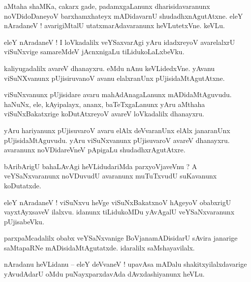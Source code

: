 \documentclass{article}
\begin{document}
\begin{mn}%
aMtaha shaMKa, cakarx gade, padamxgaLanunx dharisidavaranunx noVDidoDaneyoV barxhamxhateyx 
mADidavarnU shudadhxnAgutAtxne. eleY nAradaneV ! avarigiMtalU utatxmarAdavaranunx heVLutetxVne. 
keVLu.
\end{mn}

\begin{mn}%
eleY nAradaneV ! I loVkadalilx veYSaxvarAgi yAru idadxreyoV avarelalxrU viSuNxvige samareMdeV 
jAcnxnigaLu tiLidukoLaLxbeVku.
\end{mn}

\begin{mn}%
kaliyugadalilx avareV dhanayxru. eMdu nAnu keVLidedxVne. yAvanu viSuNXvanunx pUjisiruvanoV avanu 
elalxranUnx pUjisidaMtAgutAtxne.
\end{mn}

\begin{mn}%
viSuNxvanunx pUjisidare avaru mahAdAnagaLanunx mADidaMtAguvudu. haNuNx, ele, kAyipalayx, ananx, 
baTeTxgaLanunx yAru aMthaha viSuNxBakatxrige koDutAtxreyoV avareV loVkadalilx dhanayxru.
\end{mn}

\begin{mn}%
yAru hariyanunx pUjisuvaroV avaru elAlx deVvaranUnx elAlx janaranUnx pUjisidaMtAguvudu. yAru 
viSuNxvanunx pUjisuvaroV avareV dhanayxru. avaranunx noVDidareVneV pApigaLu shudadhxrAgutAtxre.
\end{mn}

\begin{mn}%
bAribArigU bahaLAvAgi heVLidudariMda parxyoVjaveVnu ? A veYSaNxvaranunx noVDuvudU avaranunx 
muTuTxvudU suKavanunx koDutatxde.
\end{mn}

\begin{mn}%
eleY nAradaneV ! viSuNxvu heVge viSuNxBakatxnoV hAgeyoV obabxrigU vayxtAyxsaveV ilalxvu. idanunx 
tiLidukoMDu yAvAgalU veYSaNxvaranunx pUjisabeVku.
\end{mn}

\begin{mn}%
parxpaMcadalilx obabx veYSaNxvanige BoVjanamADisidarU sAvira janarige saMtapaRNe 
mADisidaMtAgutatxde. idaralilx saMshayavilalx.
\end{mn}


\begin{mn}%
nAradanu heVLidanu -- eleY deVvaneV ! upavAsa mADalu shakitxyilalxdavarige yAvudAdarU oMdu 
puNayxparxdavAda dAvxdashiyanunx heVLu.
\end{mn}
\end{document}
